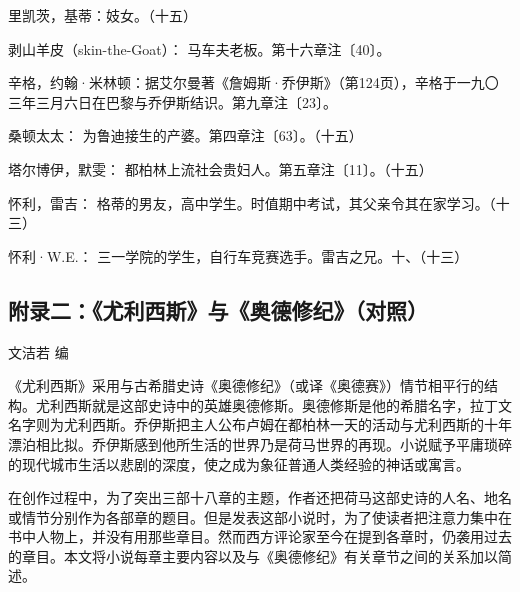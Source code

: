\par 里凯茨，基蒂：妓女。（十五）
\par 剥山羊皮（skin-the-Goat）： 马车夫老板。第十六章注〔40〕。
\par 辛格，约翰·米林顿：据艾尔曼著《詹姆斯·乔伊斯》（第124页），辛格于一九〇三年三月六日在巴黎与乔伊斯结识。第九章注〔23〕。
\par 桑顿太太： 为鲁迪接生的产婆。第四章注〔63〕。（十五）
\par 塔尔博伊，默雯： 都柏林上流社会贵妇人。第五章注〔11〕。（十五）
\par 怀利，雷吉： 格蒂的男友，高中学生。时值期中考试，其父亲令其在家学习。（十三）
\par 怀利·W.E.： 三一学院的学生，自行车竞赛选手。雷吉之兄。十、（十三）



\subsection*{附录二：《尤利西斯》与《奥德修纪》（对照）}

\begin{center}
    文洁若 编
\end{center}

\par 《尤利西斯》采用与古希腊史诗《奥德修纪》（或译《奥德赛》）情节相平行的结构。尤利西斯就是这部史诗中的英雄奥德修斯。奥德修斯是他的希腊名字，拉丁文名字则为尤利西斯。乔伊斯把主人公布卢姆在都柏林一天的活动与尤利西斯的十年漂泊相比拟。乔伊斯感到他所生活的世界乃是荷马世界的再现。小说赋予平庸琐碎的现代城市生活以悲剧的深度，使之成为象征普通人类经验的神话或寓言。
\par 在创作过程中，为了突出三部十八章的主题，作者还把荷马这部史诗的人名、地名或情节分别作为各部章的题目。但是发表这部小说时，为了使读者把注意力集中在书中人物上，并没有用那些章目。然而西方评论家至今在提到各章时，仍袭用过去的章目。本文将小说每章主要内容以及与《奥德修纪》有关章节之间的关系加以简述。


